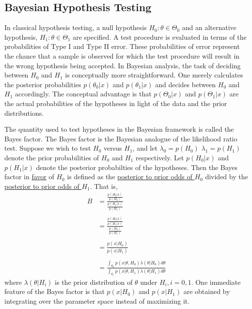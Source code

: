 \documentclass[12pt]{article}
\numberwithin{equation}{section}
\begin{document}
\subsection{Bayesian Hypothesis Testing}
In classical hypothesis testing, a null hypothesis $H_0 : \theta \in \Theta_0$ and an alternative hypothesis, $H_1 : \theta \in \Theta_1$ are specified. A test procedure is evaluated in terms of the probabilities of Type I and Type II error. These probabilities of error represent the chance that a sample is observed for which the test procedure will result in the wrong hypothesis being accepted. In Bayesian analysis, the task of deciding between $H_0$ and $H_1$ is conceptually more straightforward. One merely calculates the posterior probabilities $p(\theta_0 | x)$ and $p(\theta_1 | x)$ and decides between $H_0$ and $H_1$ accordingly. The conceptual advantage is that $p(\Theta_0 | x)$ and $p(\Theta_1 | x)$ are the actual
probabilities of the hypotheses in light of the data and the prior distributions.

The quantity used to test hypotheses in the Bayesian framework is called the Bayes factor. The Bayes factor is the Bayesian analogue of the likelihood ratio test. Suppose we wish to test $H_0$ versus $H_1$, and let $\lambda_0 = p(H_0)$  $\lambda_1 = p(H_1)$ denote the prior probabilities of $H_0$ and $H_1$ respectively. Let $p(H_0 | x)$ and $p(H_1 | x)$ denote the posterior probabilties of the hypotheses. Then the Bayes factor in \underline{favor} of $H_0$ is defined as the \underline{posterior to prior odds of $H_0$} divided by the \underline{posterior to prior odds of $H_1$}. That is,
\begin{align*}
  B &= \frac{\frac{p(H_0 | x)}{p(H_0)}}{\frac{p(H_1 | x)}{p(H_1)}} \\ \\
    &= \frac{\frac{p(H_0 | x)}{p(H_1 | x)}}{\frac{p(H_0)}{p(H_1)}} \\ \\
    &= \frac{p(x | H_0)}{p(x | H_1)} \\ \\
    &= \frac{\int_{\theta_0} p(x | \theta, H_0) \lambda(\theta | H_0) d\theta}%
    {\int_{\theta_1} p(x | \theta, H_1) \lambda(\theta | H_1) d\theta}
\end{align*}
%
where $\lambda(\theta | H_i)$ is the prior distribution of $\theta$ under $H_i, i = 0, 1$. One immediate feature of the Bayes factor is that $p(x | H_0)$ and $p(x | H_1)$ are obtained by integrating over the parameter space instead of maximizing it. 
\end{document}
